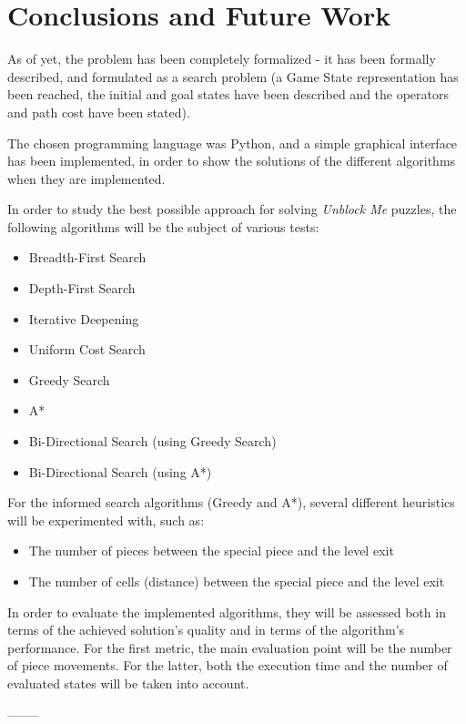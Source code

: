 \documentclass[conference]{IEEEtran}
\begin{document}
\section{Conclusions and Future Work}
As of yet, the problem has been completely formalized - it has been formally described, and formulated as a search problem (a Game State representation has been reached, the initial and goal states have been described and the operators and path cost have been stated).

The chosen programming language was Python, and a simple graphical interface has been implemented, in order to show the solutions of the different algorithms when they are implemented.

In order to study the best possible approach for solving \textit{Unblock Me} puzzles, the following algorithms will be the subject of various tests:
\begin{itemize}
    \item Breadth-First Search
    \item Depth-First Search
    \item Iterative Deepening
    \item Uniform Cost Search
    \item Greedy Search
    \item A*
    \item Bi-Directional Search (using Greedy Search)
    \item Bi-Directional Search (using A*)
\end{itemize}

For the informed search algorithms (Greedy and A*), several different heuristics will be experimented with, such as:

\begin{itemize}
    \item The number of pieces between the special piece and the level exit
    \item The number of cells (distance) between the special piece and the level exit
\end{itemize}

In order to evaluate the implemented algorithms, they will be assessed both in terms of the achieved solution's quality and in terms of the algorithm's performance. For the first metric, the main evaluation point will be the number of piece movements. For the latter, both the execution time and the number of evaluated states will be taken into account.

--------
\end{document}
